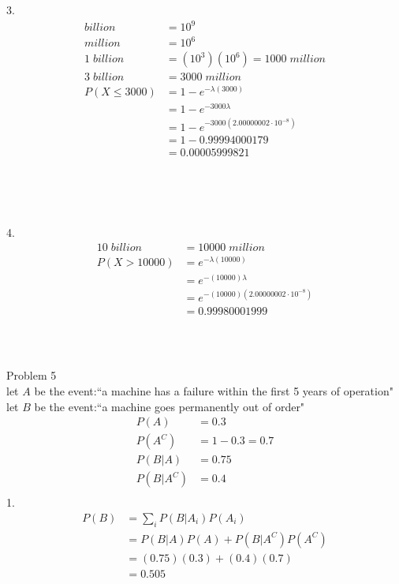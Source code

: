 \documentclass[12pt,border=4pt,multi]{article}%
\begin{document}
\\
\\
\\
\\
3.
\begin{align*}
billion &= 10^9\\
million &= 10^6\\
1\;billion &= (10^3)(10^6) = 1000\;million\\
3\;billion &= 3000\;million\\
P(X \leq 3000) &= 1 - e^{-\lambda(3000)}\\
&= 1 - e^{-3000\lambda}\\
&= 1 - e^{-3000(2.00000002 \cdot 10^{-8})}\\
&= 1 - 0.99994000179\\
&= \boxed{0.00005999821}\\
\end{align*}
\\
\\
\\
\\
4.\\
\begin{align*}
10\;billion &= 10000\;million\\
P(X > 10000) &=  e^{-\lambda(10000)}\\
&= e^{-(10000)\lambda}\\
&= e^{-(10000)(2.00000002 \cdot 10^{-8})}\\
&= \boxed{0.99980001999}\\
\end{align*}
\\
\\
\\
\newpage
\noindent
Problem 5\\
let $A$ be the event:``a machine has a failure within the first 5 years of operation"\\
let $B$ be the event:``a machine goes permanently out of order"\\
\begin{align*}
P(A) &= 0.3\\
P(A^C) &= 1 - 0.3 = 0.7\\
P(B|A) &= 0.75\\
P(B|A^C) &= 0.4\\
\end{align*}
1.
\begin{align*}
P(B) &= \sum_i P(B|A_i)P(A_i)\\
&= P(B|A)P(A) + P(B|A^C)P(A^C)\\
&= (0.75)(0.3) + (0.4)(0.7)\\
&= \boxed{0.505}\\
\end{align*}
\end{document}
